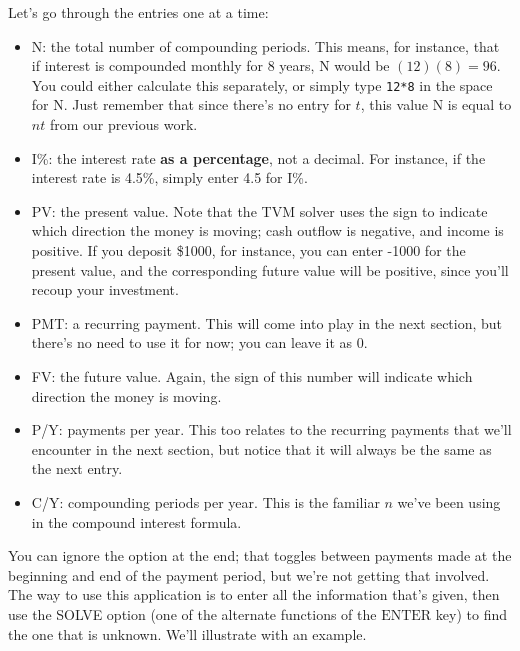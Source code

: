 Let's go through the entries one at a time:
\begin{itemize}
\item N: the total number of compounding periods.  This means, for instance, that if interest is compounded monthly for 8 years, N would be $(12)(8) = 96$.  You could either calculate this separately, or simply type \texttt{12*8} in the space for N.  Just remember that since there's no entry for $t$, this value N is equal to $nt$ from our previous work.
\item I\%: the interest rate \textbf{as a percentage}, not a decimal.  For instance, if the interest rate is 4.5\%, simply enter 4.5 for I\%.
\item PV: the present value.  Note that the TVM solver uses the sign to indicate which direction the money is moving; cash outflow is negative, and income is positive.  If you deposit \$1000, for instance, you can enter -1000 for the present value, and the corresponding future value will be positive, since you'll recoup your investment.
\item PMT: a recurring payment.  This will come into play in the next section, but there's no need to use it for now; you can leave it as 0.
\item FV: the future value.  Again, the sign of this number will indicate which direction the money is moving.
\item P/Y: payments per year.  This too relates to the recurring payments that we'll encounter in the next section, but notice that it will always be the same as the next entry.
\item C/Y: compounding periods per year.  This is the familiar $n$ we've been using in the compound interest formula.
\end{itemize}

You can ignore the option at the end; that toggles between payments made at the beginning and end of the payment period, but we're not getting that involved.\\

The way to use this application is to enter all the information that's given, then use the SOLVE option (one of the alternate functions of the $\boxed{\textrm{ENTER}}$ key) to find the one that is unknown.  We'll illustrate with an example.
\pagebreak


